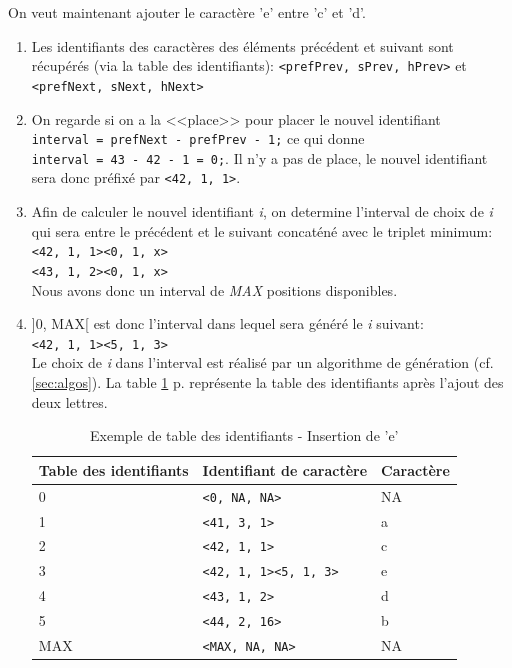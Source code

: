 		On veut maintenant ajouter le caractère 'e' entre 'c' et 'd'.
		\begin{enumerate}
			\item Les identifiants des caractères des éléments précédent et
			suivant sont récupérés (via la table des identifiants):
			\verb+<prefPrev, sPrev, hPrev>+ et \verb+<prefNext, sNext, hNext>+
			\item On regarde si on a la <<place>> pour placer le nouvel
			identifiant\\ \verb+interval = prefNext - prefPrev - 1;+ ce qui
			donne \\
			\verb+interval = 43 - 42 - 1 = 0;+. Il n'y a pas de place, le
			nouvel identifiant sera donc préfixé par \verb+<42, 1, 1>+.
			\item Afin de calculer le nouvel identifiant \emph{i}, on determine
			l'interval de choix de \emph{i} qui sera entre le précédent et le
			suivant concaténé avec le triplet minimum:\\
			\verb+<42, 1, 1><0, 1, x>+\\ 
			\verb+<43, 1, 2><0, 1, x>+\\
			Nous avons donc un interval de \emph{MAX} positions disponibles.
			\item ]0, MAX[ est donc l'interval dans lequel sera généré le
			\emph{i} suivant:\\
			\verb+<42, 1, 1><5, 1, 3>+\\
			Le choix de \emph{i} dans l'interval est réalisé par un algorithme
			de génération (cf. \ref{sec:algos}).
			La table \ref{tab:tableID_e} p.\pageref{tab:tableID_e} représente la
			table des identifiants après l'ajout des deux lettres.
				
		\begin{table}
			\center
			\begin{tabular}{|l|l|l|}			
			\hline
				Table des identifiants & Identifiant de caractère & Caractère\\
			\hline
				0 & \verb+<0, NA, NA>+ & NA\\
				1 & \verb+<41, 3, 1>+ & a\\
				2 & \verb+<42, 1, 1>+ & c\\
				3 & \verb+<42, 1, 1><5, 1, 3>+ & e\\
				4 & \verb+<43, 1, 2>+ & d\\
				5 & \verb+<44, 2, 16>+ & b\\
				MAX & \verb+<MAX, NA, NA>+ & NA\\
			\hline
			\end{tabular}
			\caption{Exemple de table des identifiants - Insertion de 'e'}
			\label{tab:tableID_e}
		\end{table} 
		\end{enumerate}~
		
